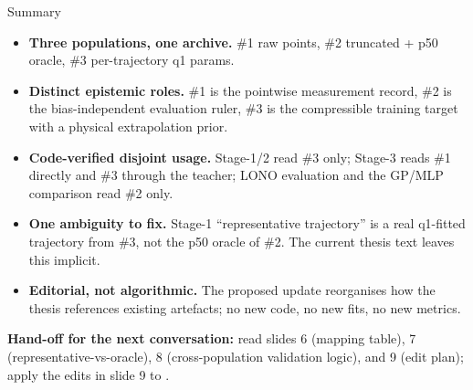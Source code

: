\documentclass[UTF8,aspectratio=169]{ctexbeamer}
\begin{document}
\begin{frame}{Summary}
\small
\begin{itemize}\setlength\itemsep{3pt}
  \item \textbf{Three populations, one archive.} \#1 raw points, \#2 truncated + p50 oracle, \#3 per-trajectory q1 params.
  \item \textbf{Distinct epistemic roles.} \#1 is the pointwise measurement record, \#2 is the bias-independent evaluation ruler, \#3 is the compressible training target with a physical extrapolation prior.
  \item \textbf{Code-verified disjoint usage.} Stage-1/2 read \#3 only; Stage-3 reads \#1 directly and \#3 through the teacher; LONO evaluation and the GP/MLP comparison read \#2 only.
  \item \textbf{One ambiguity to fix.} Stage-1 ``representative trajectory'' is a real q1-fitted trajectory from \#3, not the p50 oracle of \#2. The current thesis text leaves this implicit.
  \item \textbf{Editorial, not algorithmic.} The proposed update reorganises how the thesis references existing artefacts; no new code, no new fits, no new metrics.
\end{itemize}

\vspace{0.6em}
\textbf{Hand-off for the next conversation:} read slides 6 (mapping table), 7 (representative-vs-oracle), 8 (cross-population validation logic), and 9 (edit plan); apply the edits in slide 9 to .
\end{frame}
\end{document}
